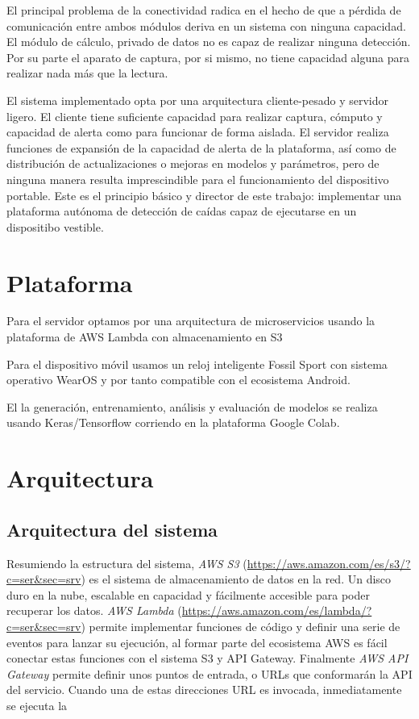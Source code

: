 El principal problema de la conectividad radica en el hecho de que a pérdida de comunicación entre ambos módulos deriva en un sistema con ninguna capacidad. El módulo de cálculo, privado de datos no es capaz de realizar ninguna detección. Por su parte el aparato de captura, por si mismo, no tiene capacidad alguna para realizar nada más que la lectura.

El sistema implementado opta por una arquitectura cliente-pesado y servidor ligero. El cliente tiene suficiente capacidad para realizar captura, cómputo y capacidad de alerta como para funcionar de forma aislada. El servidor realiza funciones de expansión de la capacidad de alerta de la plataforma, así como de distribución de actualizaciones o mejoras en modelos y parámetros, pero de ninguna manera resulta imprescindible para el funcionamiento del dispositivo portable. Este es el principio básico y director de este trabajo: implementar una plataforma autónoma de detección de caídas capaz de ejecutarse en un dispositibo vestible.


\section{Plataforma}
Para el servidor optamos por una arquitectura de microservicios usando la plataforma de AWS Lambda con almacenamiento en S3

Para el dispositivo móvil usamos un reloj inteligente Fossil Sport con sistema operativo WearOS y por tanto compatible con el ecosistema Android.

El la generación, entrenamiento, análisis y evaluación de modelos se realiza usando Keras/Tensorflow corriendo en la plataforma Google Colab.

\section{Arquitectura}\label{desc_archi}

\subsection{Arquitectura del sistema}

Resumiendo la estructura del sistema, \textit{AWS S3} (\url{https://aws.amazon.com/es/s3/?c=ser&sec=srv}) es el sistema de almacenamiento de datos en la red. Un disco duro en la nube, escalable en capacidad y fácilmente accesible para poder recuperar los datos. \textit{AWS Lambda} (\url{https://aws.amazon.com/es/lambda/?c=ser&sec=srv}) permite implementar funciones de código y definir una serie de eventos para lanzar su ejecución, al formar parte del ecosistema AWS es fácil conectar estas funciones con el sistema S3 y API Gateway. Finalmente \textit{AWS API Gateway} permite definir unos puntos de entrada, o URLs que conformarán la API del servicio. Cuando una de estas direcciones URL es invocada, inmediatamente se ejecuta la 



